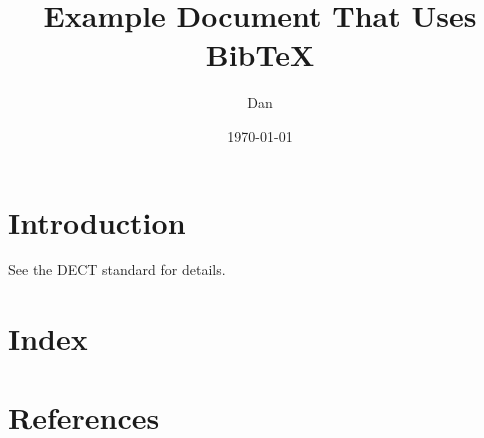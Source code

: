\documentclass[11pt]{article}
\title{Example Document That Uses BibTeX}
\author{Dan}
\date{\today}
\begin{document}
\maketitle
\section{Introduction}
See the DECT standard\cite{en300.175-2v1.4.2} for details.

\section{Index}
\printindex

\section{References}



\end{document}

